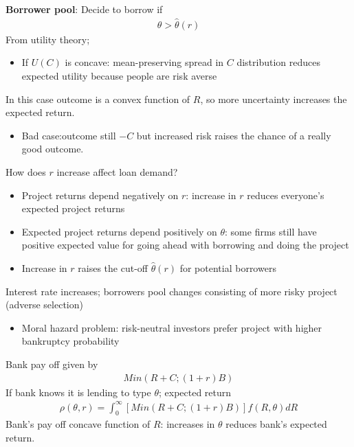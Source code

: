 \documentclass{beamer}
\begin{document}
\begin{frame}
\textbf{Borrower pool}: Decide to borrow if
\begin{align}
  \theta > \hat{\theta}(r)
\end{align}
\medskip
From utility theory;
\begin{itemize}
  \item If $U(C)$ is concave: mean-preserving spread in $C$ distribution reduces expected utility because people are risk averse
\end{itemize}
\medskip
In this case outcome is a convex function of $R$, so more uncertainty increases the expected return. 
\begin{itemize}
  \item Bad case:outcome still $−C$ but increased risk raises the chance of a really good outcome.
\end{itemize}
\end{frame}

\begin{frame}
 How does $r$ increase affect loan demand?  
\begin{itemize}
  \item Project returns depend negatively on $r$: increase in $r$ reduces everyone's expected project returns  
  \item Expected project returns depend positively on $\theta$: some firms still have positive expected value for
    going ahead with borrowing and doing the project
  \item Increase in $r$ raises the cut-off $\hat{\theta}(r)$ for potential borrowers
\end{itemize}
\medskip
 Interest rate increases; borrowers pool changes consisting of more risky project (adverse selection)
 \begin{itemize}
   \item Moral hazard problem: risk-neutral investors prefer project with higher bankruptcy probability
 \end{itemize}
\end{frame}

\begin{frame}
Bank pay off given by
\begin{align}
  Min(R+C;(1+r)B)
\end{align}
 If bank knows it is lending to type $\theta$; expected return
\begin{align}
  \rho(\theta,r)=\int_0^{\infty}[Min(R+C;(1+r)B)]f(R,\theta)dR
\end{align}
 \medskip
 Bank's pay off concave function of $R$: increases in $\theta$ reduces bank's expected return.
\end{frame}
\end{document}
